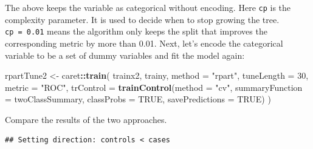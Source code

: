 \documentclass[12pt,]{krantz}
\makeatletter
\newenvironment{Shaded}{\begin{snugshade}}{\end{snugshade}}
\newcommand{\DataTypeTok}[1]{\textcolor[rgb]{0.27,0.27,0.27}{#1}}
\newcommand{\DecValTok}[1]{\textcolor[rgb]{0.06,0.06,0.06}{#1}}
\newcommand{\KeywordTok}[1]{\textcolor[rgb]{0.27,0.27,0.27}{\textbf{#1}}}
\newcommand{\NormalTok}[1]{#1}
\newcommand{\OperatorTok}[1]{\textcolor[rgb]{0.43,0.43,0.43}{\textbf{#1}}}
\newcommand{\OtherTok}[1]{\textcolor[rgb]{0.37,0.37,0.37}{#1}}
\newcommand{\StringTok}[1]{\textcolor[rgb]{0.5,0.5,0.5}{#1}}
\newenvironment{kframe}{%
\medskip{}
\setlength{\fboxsep}{.8em}
 \def\at@end@of@kframe{}%
 \ifinner\ifhmode%
  \def\at@end@of@kframe{\end{minipage}}%
  \begin{minipage}{\columnwidth}%
 \fi\fi%
 \def\FrameCommand##1{\hskip\@totalleftmargin \hskip-\fboxsep
 \colorbox{shadecolor}{##1}\hskip-\fboxsep
     \hskip-\linewidth \hskip-\@totalleftmargin \hskip\columnwidth}%
 \MakeFramed {\advance\hsize-\width
   \@totalleftmargin\z@ \linewidth\hsize
   \@setminipage}}%
 {\par\unskip\endMakeFramed%
 \at@end@of@kframe}
\renewenvironment{Shaded}{\begin{kframe}}{\end{kframe}}
\makeatother
\begin{document}
The above keeps the variable as categorical without encoding. Here \texttt{cp} is the complexity parameter. It is used to decide when to stop growing the tree. \texttt{cp\ =\ 0.01} means the algorithm only keeps the split that improves the corresponding metric by more than 0.01. Next, let's encode the categorical variable to be a set of dummy variables and fit the model again:

\begin{Shaded}
\begin{Highlighting}[]
\NormalTok{rpartTune2 <-}\StringTok{ }\NormalTok{caret}\OperatorTok{::}\KeywordTok{train}\NormalTok{(}
\NormalTok{  trainx2, trainy, }\DataTypeTok{method =} \StringTok{"rpart"}\NormalTok{,}
  \DataTypeTok{tuneLength =} \DecValTok{30}\NormalTok{,}
  \DataTypeTok{metric =} \StringTok{"ROC"}\NormalTok{, }
  \DataTypeTok{trControl =} \KeywordTok{trainControl}\NormalTok{(}\DataTypeTok{method =} \StringTok{"cv"}\NormalTok{,}
                           \DataTypeTok{summaryFunction =}\NormalTok{ twoClassSummary,}
                           \DataTypeTok{classProbs =} \OtherTok{TRUE}\NormalTok{,}
                           \DataTypeTok{savePredictions =} \OtherTok{TRUE}\NormalTok{)}
\NormalTok{  )}
\end{Highlighting}
\end{Shaded}

Compare the results of the two approaches.

\begin{Shaded}
\end{Shaded}

\begin{verbatim}
## Setting direction: controls < cases
\end{verbatim}

\begin{Shaded}
\end{Shaded}
\end{document}
